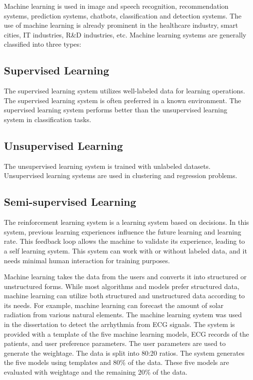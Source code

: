 Machine learning is used in image and speech recognition, recommendation systems, prediction systems, chatbots, classification and detection systems. The use of machine learning is already prominent in the healthcare industry, smart cities, IT industries, R\&D industries, etc. Machine learning systems are generally classified into three types:

\subsection{Supervised Learning}\label{subsec:supervised_learning_intro}

The supervised learning system utilizes well-labeled data for learning operations. The supervised learning system is often preferred in a known environment. The supervised learning system performs better than the unsupervised learning system in classification tasks. 

\subsection{Unsupervised Learning}\label{subsec:unsupervised_learning_intro}

The unsupervised learning system is trained with unlabeled datasets. Unsupervised learning systems are used in clustering and regression problems.

\subsection{Semi-supervised Learning}\label{subsec:semi_supervised_learning_intro}

The reinforcement learning system is a learning system based on decisions. In this system, previous learning experiences influence the future learning and learning rate. This feedback loop allows the machine to validate its experience, leading to a self learning system. This system can work with or without labeled data, and it needs minimal human interaction for training purposes.

Machine learning takes the data from the users and converts it into structured or unstructured forms. While most algorithms and models prefer structured data, machine learning can utilize both structured and unstructured data according to its needs. For example, machine learning can forecast the amount of solar radiation from various natural elements. The machine learning system was used in the dissertation to detect the arrhythmia from ECG signals. The system is provided with a template of the five machine learning models, ECG records of the patients, and user preference parameters. The user parameters are used to generate the weightage. The data is split into 80:20 ratios. The system generates the five models using templates and 80\% of the data. These five models are evaluated with weightage and the remaining 20\% of the data.

